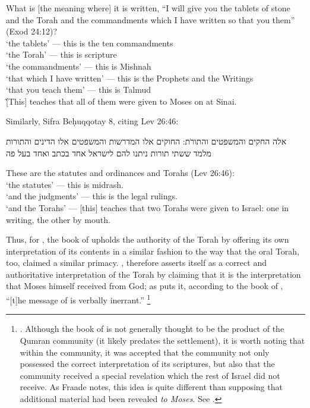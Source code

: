 \begin{translation}
    What is [the meaning where] it is written, ``I will give you the tablets of stone and the Torah and the commandments which I have written so that you them'' (Exod 24:12)?\\
    \-\hspace{2em}`the tablets' --- this is the ten commandments\\
    \-\hspace{2em}`the Torah' --- this is scripture\\
    \-\hspace{2em}`the commandments' --- this is Mishnah\\
    \-\hspace{2em}`that which I have written' --- this is the Prophets and the Writings\\
    \-\hspace{2em}`that you teach them' --- this is Talmud\\\~
    [This] teaches that all of them were given to Moses on at Sinai.
\end{translation}
\noindent
Similarly, Sifra Beḥuqqotay 8, citing Lev 26:46:
\begin{aramaictranslation}
    אלה החקים והמשפטים והתורֹת: החוקים אלו המדרשות והמשפטים אלו הדינים והתורות מלמד ששתי תורות ניתנו להם לישראל אחד בכתב ואחד בעל פה
\end{aramaictranslation}
\begin{translation}
    These are the statutes and ordinances and Torahs (Lev 26:46):\\
    \-\hspace{2em} `the statutes' --- this is midrash.\\
    \-\hspace{2em} `and the judgments' --- this is the legal rulings.\\
    \-\hspace{2em} `and the Torahs' --- [this] teaches that two Torahs were given to Israel: one in writing, the other by mouth.
\end{translation}

\noindent
Thus, for \vanderkam, the book of \jub upholds the authority of the Torah by offering its own interpretation of its contents in a similar fashion to the way that the oral Torah, too, claimed a similar primacy. \jub, therefore asserts itself as a correct and authoritative interpretation of the Torah by claiming that it is the interpretation that Moses himself received from God; as \vanderkam puts it, according to the book of \jub, ``[t]he message of \jub is verbally inerrant.''%
    \footnote{\cite[33]{vanderkam_metso-etal2010}. Although the book of \jub is not generally thought to be the product of the Qumran community (it likely predates the settlement), it is worth noting that within the community, it was accepted that the community not only possessed the correct interpretation of its scriptures, but also that the community received a special revelation which the rest of Israel did not receive. As Fraade notes, this idea is quite different than supposing that additional material had been revealed \emph{to Moses}. See \cite[67]{fraade_jjs1993}.}

